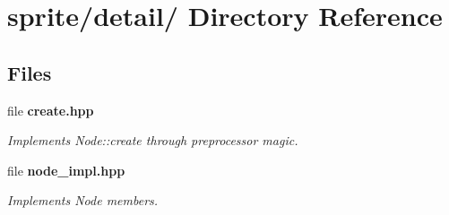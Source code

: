 \section{sprite/detail/ Directory Reference}
\label{dir_000001}
\subsection*{Files}
\begin{CompactItemize}
\item 
file {\bf create.hpp}
\begin{CompactList}\small\item\em Implements Node::create through preprocessor magic. \item\end{CompactList}

\item 
file {\bf node\_\-impl.hpp}
\begin{CompactList}\small\item\em Implements Node members. \item\end{CompactList}

\end{CompactItemize}
